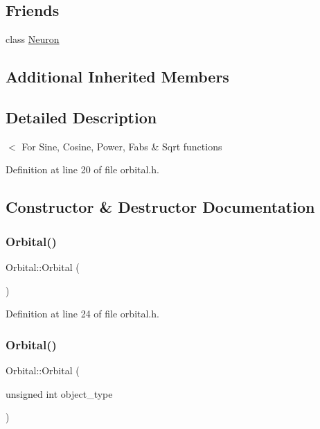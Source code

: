 \subsection*{Friends}
\begin{DoxyCompactItemize}
\item 
class \mbox{\hyperlink{class_orbital_aa410d74ba34b18a9f6bdf24323c4ee5b}{Neuron}}
\end{DoxyCompactItemize}
\subsection*{Additional Inherited Members}


\subsection{Detailed Description}
$<$ For Sine, Cosine, Power, Fabs \& Sqrt functions 

Definition at line 20 of file orbital.\+h.



\subsection{Constructor \& Destructor Documentation}
\mbox{\label{class_orbital_ac6f5367141eaa6fb4fa825262da4593a}} 
\subsubsection{\texorpdfstring{Orbital()}{Orbital()}\hspace{0.1cm}{\footnotesize\ttfamily [1/4]}}
{\footnotesize\ttfamily Orbital\+::\+Orbital (\begin{DoxyParamCaption}{ }\end{DoxyParamCaption})\hspace{0.3cm}{\ttfamily [inline]}}



Definition at line 24 of file orbital.\+h.

\mbox{\label{class_orbital_a1c7dd9f58b740ce5058ce04aab54292c}} 
\subsubsection{\texorpdfstring{Orbital()}{Orbital()}\hspace{0.1cm}{\footnotesize\ttfamily [2/4]}}
{\footnotesize\ttfamily Orbital\+::\+Orbital (\begin{DoxyParamCaption}\item[{unsigned int}]{object\+\_\+type }\end{DoxyParamCaption})\hspace{0.3cm}{\ttfamily [inline]}}



